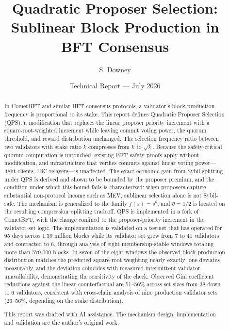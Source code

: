 \documentclass[11pt,a4paper]{article}
\title{Quadratic Proposer Selection:\\Sublinear Block Production in BFT Consensus}
\author{S. Downey}
\date{Technical Report --- July 2026}
\begin{document}
\maketitle

\begin{abstract}
In CometBFT and similar BFT consensus protocols, a validator's block production frequency is proportional to its stake. This report defines Quadratic Proposer Selection (QPS), a modification that replaces the linear proposer priority increment with a square-root-weighted increment while leaving commit voting power, the quorum threshold, and reward distribution unchanged. The selection frequency ratio between two validators with stake ratio $k$ compresses from $k$ to $\sqrt{k}$. Because the safety-critical quorum computation is untouched, existing BFT safety proofs apply without modification, and infrastructure that verifies commits against linear voting power---light clients, IBC relayers---is unaffected. The exact economic gain from Sybil splitting under QPS is derived and shown to be bounded by the proposer premium, and the condition under which this bound fails is characterized: when proposers capture substantial non-protocol income such as MEV, sublinear selection alone is not Sybil-safe. The mechanism is generalized to the family $f(s) = s^\theta$, and $\theta = 1/2$ is located on the resulting compression--splitting tradeoff. QPS is implemented in a fork of CometBFT, with the change confined to the proposer-priority increment in the validator-set logic. The implementation is validated on a testnet that has operated for 95 days across 1.39 million blocks while its validator set grew from 7 to 41 validators and contracted to 6, through analysis of eight membership-stable windows totaling more than 579{,}000 blocks. In seven of the eight windows the observed block production distribution matches the predicted square-root weighting nearly exactly; one deviates measurably, and the deviation coincides with measured intermittent validator unavailability, demonstrating the sensitivity of the check. Observed Gini coefficient reductions against the linear counterfactual are 51--56\% across set sizes from 38 down to 6 validators, consistent with cross-chain analysis of nine production validator sets (26--56\%, depending on the stake distribution).

\bigskip
This report was drafted with AI assistance. The mechanism design, implementation and validation are the author's original work.
\end{abstract}
\end{document}
